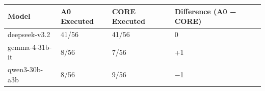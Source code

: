 \begin{longtable}[]{@{}llll@{}}
\toprule\noalign{}
Model & A0 Executed & CORE Executed & Difference (A0 − CORE) \\
\midrule\noalign{}
\endhead
\bottomrule\noalign{}
\endlastfoot
deepseek-v3.2 & 41/56 & 41/56 & 0 \\
gemma-4-31b-it & 8/56 & 7/56 & +1 \\
qwen3-30b-a3b & 8/56 & 9/56 & −1 \\
\end{longtable}
